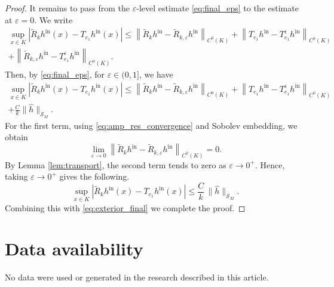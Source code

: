 \documentclass[12pt,a4paper]{amsart}
\numberwithin{equation}{section}
\theoremstyle{plain}
\theoremstyle{definition}
\begin{document}
\begin{proof}
It remains to pass from the $\varepsilon$-level estimate \eqref{eq:final_eps} to the estimate at $\varepsilon = 0$.
We write
\begin{multline*}
    \sup_{x \in K}\left|\widetilde{R}_k h^{\mathrm{in}}(x)
    -
    T_{e_1} h^{\mathrm{in}}(x) \right|
    \leq
    \left\|\widetilde{R}_k h^{\mathrm{in}}
    -
    \widetilde{R}_{k,\varepsilon} h^{\mathrm{in}} 
    \right\|_{C^0(K)} 
    + 
    \left\|T_{e_1} h^{\mathrm{in}}
    -
    T_{e_1}^\varepsilon h^{\mathrm{in}} 
    \right\|_{C^0(K)}\\
    + 
    \left\|\widetilde{R}_{k,\varepsilon} h^{\mathrm{in}}
    - T_{e_1}^\varepsilon h^{\mathrm{in}} \right\|_{C^0(K)}.
\end{multline*}
Then, by \eqref{eq:final_eps}, for $\varepsilon\in (0,1]$, we have
\begin{multline*}
    \sup_{x \in K}\left|\widetilde{R}_k h^{\mathrm{in}}(x)
    -
    T_{e_1} h^{\mathrm{in}}(x) \right|
    \leq
    \left\|\widetilde{R}_k h^{\mathrm{in}}
    -
    \widetilde{R}_{k,\varepsilon} h^{\mathrm{in}} 
    \right\|_{C^0(K)} 
    + 
    \left\|T_{e_1} h^{\mathrm{in}}
    -
    T_{e_1}^\varepsilon h^{\mathrm{in}} 
    \right\|_{C^0(K)}\\
    + 
    \frac{C}{k}\|\widehat h\|_{\mathscr{S}_{M}}.
\end{multline*}
For the first term, using \eqref{eq:amp_res_convergence} and Sobolev embedding, we obtain
\begin{equation*}
    \lim_{\varepsilon\to 0} \left\|\widetilde{R}_k h^{\mathrm{in}}
    -
    \widetilde{R}_{k,\varepsilon} h^{\mathrm{in}} 
    \right\|_{C^0(K)} =0.
\end{equation*}
By Lemma \ref{lem:transport}, the second term tends to zero as $\varepsilon\to 0^+$. Hence, taking $\varepsilon\to 0^+$ gives the following. 
\begin{equation}\label{eq:interior_final}
\sup_{x \in K}
\left|
\widetilde{R}_k h^{\mathrm{in}}(x)
-
T_{e_1} h^{\mathrm{in}}(x)
\right|
\le
\frac{C}{k}\,
\|\widehat{h}\|_{\mathscr{S}_{M}}.
\end{equation}
Combining this with \eqref{eq:exterior_final} we complete the proof.
\end{proof}






\section*{Data availability}
No data were used or generated in the research described in this article.
\end{document}
